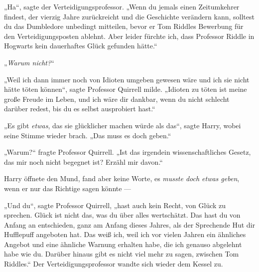 „Ha“, sagte der Verteidigungsprofessor.
„Wenn du jemals einen Zeitumkehrer findest, der vierzig Jahre zurückreicht und die Geschichte verändern kann, solltest du das Dumbledore unbedingt mitteilen, bevor er Tom Riddles Bewerbung für den Verteidigungsposten ablehnt. Aber leider fürchte ich, dass Professor Riddle in Hogwarts kein dauerhaftes Glück gefunden hätte.“

„\emph{Warum nicht?}“

„Weil ich dann immer noch von Idioten umgeben gewesen wäre und ich sie nicht hätte töten können“, sagte Professor Quirrell milde.
„Idioten zu töten ist meine große Freude im Leben, und ich wäre dir dankbar, wenn du nicht schlecht darüber redest, bis du es selbst ausprobiert hast.“

„Es gibt \emph{etwas}, das sie glücklicher machen würde als das“, sagte Harry, wobei seine Stimme wieder brach.
„Das muss es doch geben.“

„Warum?“ fragte Professor Quirrell.
„Ist das irgendein wissenschaftliches Gesetz, das mir noch nicht begegnet ist? Erzähl mir davon.“

Harry öffnete den Mund, fand aber keine Worte, es \emph{musste doch etwas geben}, wenn er nur das Richtige sagen könnte —

„Und du“, sagte Professor Quirrell, „hast auch kein Recht, von Glück zu sprechen. Glück ist nicht das, was du über alles wertschätzt. Das hast du von Anfang an entschieden, ganz am Anfang dieses Jahres, als der Sprechende Hut dir Hufflepuff angeboten hat. Das weiß ich, weil ich vor vielen Jahren ein ähnliches Angebot und eine ähnliche Warnung erhalten habe, die ich genauso abgelehnt habe wie du. Darüber hinaus gibt es nicht viel mehr zu sagen, zwischen Tom Riddles.“
Der Verteidigungsprofessor wandte sich wieder dem Kessel zu.

